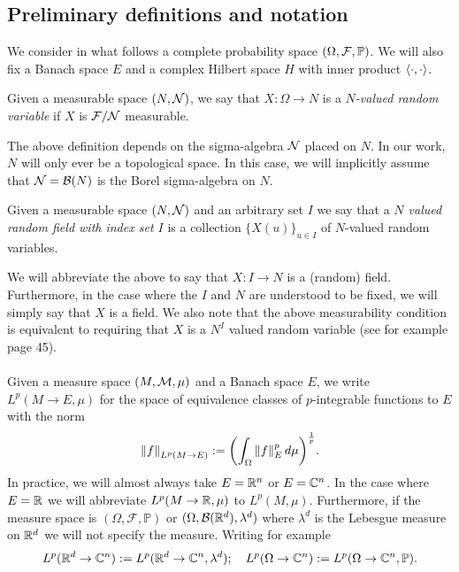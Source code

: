 \documentclass[
    a4paper,
    DIV=14,
    abstract=true,
    numbers=noenddot
]{scrartcl}
\begin{document}
\subsection{Preliminary definitions and notation}
We consider in what follows a complete probability space $(\Omega,\mathcal{F},\mathbb{P})$. We will also fix a Banach space $E$ and a complex Hilbert space $H$ with inner product $\left\langle\cdot,\cdot\right\rangle$.
\begin{definition}
	Given a measurable space $(N,\mathcal{N})$, we say that $X:\Omega\to N$ is a \emph{$N$-valued random variable} if  $X$ is  $\mathcal{F}/\mathcal{N}$  measurable.
\end{definition}
The above definition depends on the sigma-algebra $\mathcal{N}$ placed on $N$. In our work, $N$ will only ever be a topological space. In this case, we will implicitly assume that $\mathcal{N}=\mathcal{B}(N)$ is the Borel sigma-algebra on $N$.
\begin{definition}
	Given a measurable space $(N,\mathcal{N})$ and an arbitrary set $I$  we say that a \emph{$N$ valued random field with index set $I$} is a collection $\{X(u)\}_{u\in I} $ of $N$-valued random variables.
\end{definition}
We will abbreviate the above to say that $X: I\to N$ is a (random) field. Furthermore, in the case where the $I$ and  $N$ are understood to be fixed, we will simply say that $X$ is a field. We also note that the above measurability condition is equivalent to requiring that $X$ is a  $N^I$ valued random variable (see for example \cite{ccinlar2011probability} page 45).
\\
\\
Given a measure space $(M,\mathcal{M},\mu )$ and a Banach space $E$, we write\\
$L^p(M\to E,\mu)$ for the space of equivalence classes of $p$-integrable functions to  $E$ with the norm
\begin{equation*}
	\left\lVert f \right\rVert_{L^p(M\to E)}:=\qty(\int_{\Omega}\left\lVert f \right\rVert^p_E d\mu)^\frac{1}{p}.
\end{equation*}
In practice, we will almost always take $E=\mathbb{R}^n$ or $E=\mathbb{C}^n$. In the case where $E=\mathbb{R}$ we will abbreviate $L^p(M\to\mathbb{R},\mu)$ to $L^p(M,\mu)$. Furthermore, if the measure space is $(\Omega,\mathcal{F},\mathbb{P})$ or $(\Omega,\mathcal{B}(\mathbb{R}^d),\lambda^d)$ where $\lambda^d$ is the Lebesgue measure on $\mathbb{R}^d$ we will not specify the measure. Writing for example
\begin{equation*}
	L^p(\mathbb{R}^d\to\mathbb{C}^n):=L^p(\mathbb{R}^d\to\mathbb{C}^n,\lambda^d);\quad L^p(\Omega\to\mathbb{C}^n):=L^p(\Omega\to\mathbb{C}^n,\mathbb{P}).
\end{equation*}
\end{document}
